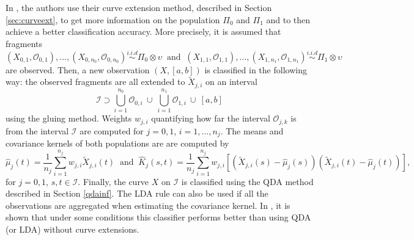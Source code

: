\documentclass[10pt, a4paper]{report}
\newcommand{\I}[0]{\mathcal{I}}
\newcommand{\Oo}[0]{\mathcal{O}}
\theoremstyle{definition}
\theoremstyle{remark}
\begin{document}
In \cite{DH1}, the authors use their curve extension method, described in Section \ref{sec:curveext}, to get more information on the population $\Pi_0$ and $\Pi_1$ and to then achieve a better classification accuracy. More precisely, it is assumed that fragments 
$$(X_{0,1},\Oo_{0,1}),...,(X_{0,n_0},\Oo_{0,n_0})\stackrel{i.i.d}{\sim} \Pi_0 \otimes \upsilon \ \text{ and } \ (X_{1,1},\Oo_{1,1}),...,(X_{1,n_1},\Oo_{1,n_1})\stackrel{i.i.d}{\sim} \Pi_1 \otimes \upsilon$$
are observed. Then, a new observation $(X,[a,b])$ is classified in the following way: the observed fragments are all extended to $\tilde{X}_{j,i}$ on an interval
$$\I \supset \bigcup_{i=1}^{n_0}\Oo_{0,i} \ \cup \ \bigcup_{i=1}^{n_1}\Oo_{1,i} \ \cup \ [a,b]$$
using the gluing method. Weights $w_{j,i}$ quantifying how far the interval $\Oo_{j,k}$ is from the interval $\I$ are computed for $j=0,1$, $i=1,...,n_j$. The means and covariance kernels of both populations are are computed by
$$\hat{\mu}_j(t) = \frac{1}{n_j} \sum_{i=1}^{n_j} w_{j,i}\tilde{X}_{j,i}(t) \ \text{ and } \ \hat{K}_j(s,t) = \frac{1}{n_j} \sum_{i=1}^{n_j} w_{j,i}\left[(\tilde{X}_{j,i}(s)-\hat{\mu}_j(s))(\tilde{X}_{j,i}(t)-\hat{\mu}_j(t))\right],$$
for $j=0,1$, $s,t \in \I$. Finally, the curve $X$ on $\I$ is classified using the QDA method described in Section \ref{qdainf}. The LDA rule can also be used if all the observations are aggregated when estimating the covariance kernel. In \cite[Section 5.2]{DH1}, it is shown that under some conditions this classifier performs better than using QDA (or LDA) without curve extensions. 
\end{document}
